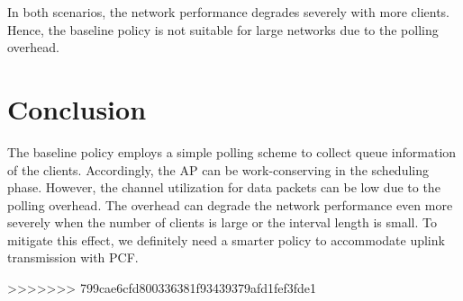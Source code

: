 \documentclass{article}
\begin{document}
In both scenarios, the network performance degrades severely with more clients. Hence, the baseline policy is not suitable for large networks due to the polling overhead. 



\section{Conclusion}
The baseline policy employs a simple polling scheme to collect queue information of the clients. Accordingly, the AP can be work-conserving in the scheduling phase. However, the channel utilization for data packets can be low due to the polling overhead. The overhead can degrade the network performance even more severely when the number of clients is large or the interval length is small. To mitigate this effect, we definitely need a smarter policy to accommodate uplink transmission with PCF.

>>>>>>> 799cae6cfd800336381f93439379afd1fef3fde1
\end{document}
